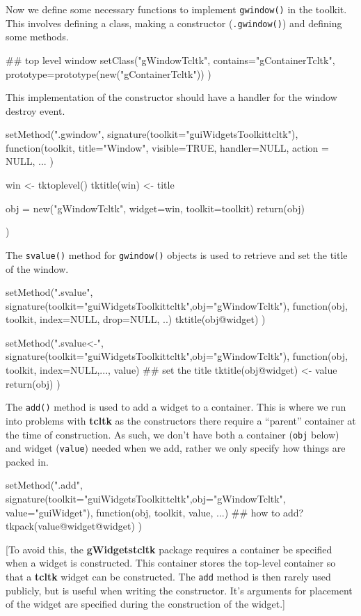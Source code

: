 \documentclass[12pt]{article}
\newcommand{\RCode}[1]{\texttt{#1}}
\newcommand{\RFunc}[1]{\texttt{#1()}}
\newcommand{\RPackage}[1]{\textbf{#1}}
\begin{document}
Now we define some necessary functions to implement \RFunc{gwindow} in
the toolkit. This involves defining a class, making a constructor
(\RFunc{.gwindow}) and defining some methods.

\begin{Scode}
## top level window
setClass("gWindowTcltk",
contains="gContainerTcltk",
prototype=prototype(new("gContainerTcltk"))
)
\end{Scode}

This implementation of the constructor should have a handler for the
window destroy event.
\begin{Scode}
  setMethod(".gwindow",
  signature(toolkit="guiWidgetsToolkittcltk"),
  function(toolkit,
  title="Window", visible=TRUE,
  handler=NULL, action = NULL,
  ...
  ) {
    win <- tktoplevel()
    tktitle(win) <- title
    
    obj = new("gWindowTcltk", widget=win, toolkit=toolkit)
    return(obj)
  })
\end{Scode}

The \RFunc{svalue} method for \RFunc{gwindow} objects is used to
retrieve and set the title of the window. 

\begin{Scode}
setMethod(".svalue",
signature(toolkit="guiWidgetsToolkittcltk",obj="gWindowTcltk"),
function(obj, toolkit, index=NULL, drop=NULL, ..) {
  tktitle(obj@widget)
})

setMethod(".svalue<-",
signature(toolkit="guiWidgetsToolkittcltk",obj="gWindowTcltk"),
function(obj, toolkit, index=NULL,..., value) {
  ## set the title
  tktitle(obj@widget) <- value
  return(obj)
})
\end{Scode}

The \RFunc{add} method is used to add a widget to a container. This is
where we run into problems with \RPackage{tcltk} as the constructors
there require a ``parent'' container at the time of construction. As
such, we don't have both a container (\RCode{obj} below) and  widget
(\RCode{value}) needed when we add, rather we only specify how things
are packed in.

\begin{Scode}
setMethod(".add",
signature(toolkit="guiWidgetsToolkittcltk",obj="gWindowTcltk",
value="guiWidget"),
function(obj, toolkit, value, ...) {
  ## how to add?
  tkpack(value@widget@widget)
})
\end{Scode}

[To avoid this, the \RPackage{gWidgetstcltk} package requires a
container be specified when a widget is constructed. This container
stores the top-level container so that a \RPackage{tcltk} widget can
be constructed. The \RCode{add} method is then rarely used publicly,
but is useful when writing the constructor. It's
arguments for placement of the widget are specified during the
construction of the widget.]
\end{document}
